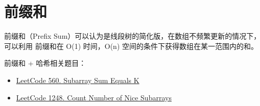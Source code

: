 \section{前缀和}
前缀和（Prefix Sum）可以认为是线段树的简化版，在数组不频繁更新的情况下，可以利用
前缀和在 O(1) 时间，O(n) 空间的条件下获得数组在某一范围内的和。

前缀和 + 哈希相关题目：
\begin{itemize}
  \item
    \href{https://leetcode.com/problems/subarray-sum-equals-k/}{LeetCode 560. Subarray Sum Equals K}
  \item
    \href{https://leetcode.com/problems/count-number-of-nice-subarrays/}{LeetCode
      1248. Count Number of Nice Subarrays}
\end{itemize}

%

